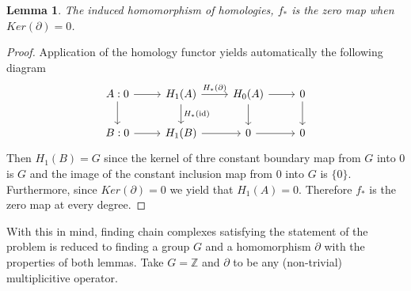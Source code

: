 \documentclass[11pt]{amsart}
\newtheorem{lemma}[theorem]{Lemma}
\theoremstyle{definition}
\numberwithin{theorem}{section}
\numberwithin{definition}{section}
\numberwithin{equation}{section}
\begin{document}
\begin{lemma}
	The induced homomorphism of homologies, $f_*$ is the zero map when $Ker(\partial) = 0$.   
\end{lemma}
\begin{proof}
Application of the homology functor yields automatically the following diagram
\begin{equation*}
	\begin{tikzcd}
		A: 0\arrow{d} \arrow{r} & H_1(A) \arrow{r}{H_*(\partial)}\arrow{d}{H_*(\text{id})}  &  H_0(A) \arrow{r}\arrow{d} & 0\arrow{d} \\
		B: 0 \arrow{r}& H_1(B) \arrow{r}& 0 \arrow{r}& 0
	\end{tikzcd}
\end{equation*}
Then $H_1(B) = G$ since the kernel of thre constant boundary map from $G$ into $0$ is $G$ and the image of the constant inclusion map from $0$ into $G$ is $\{0\}$. Furthermore, since $Ker(\partial) =0$ we yield that $H_1(A) = 0.$ Therefore $f_*$ is the zero map at every degree.
\end{proof}

With this in mind, finding chain complexes satisfying the statement of the problem is reduced to finding a group $G$ and a homomorphism $\partial$ with the properties of both lemmas. Take $G =\mathbb{Z} $ and $\partial$ to be any (non-trivial) multiplicitive  operator.
\end{document}
